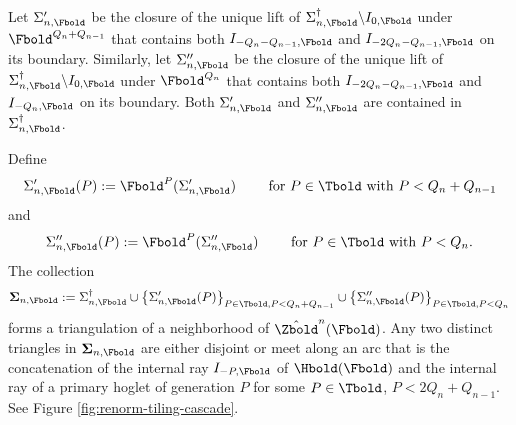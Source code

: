 \documentclass{amsart}
\begin{document}
    Let $\Sigma'_{n,\Fbold}$ be the closure of the unique lift of $\Sigma^\dagger_{n,\Fbold} \backslash I_{0,\Fbold}$ under $\Fbold^{Q_n+Q_{n-1}}$ that contains both $I_{-Q_n-Q_{n-1},\Fbold}$ and $I_{-2Q_n-Q_{n-1},\Fbold}$ on its boundary.
    Similarly, let $\Sigma''_{n,\Fbold}$ be the closure of the unique lift of $\Sigma^\dagger_{n,\Fbold} \backslash I_{0,\Fbold}$ under $\Fbold^{Q_n}$ that contains both $I_{-2Q_n-Q_{n-1},\Fbold}$ and $I_{-Q_n,\Fbold}$ on its boundary.
    Both $\Sigma'_{n,\Fbold}$ and $\Sigma''_{n,\Fbold}$ are contained in $\Sigma^\dagger_{n,\Fbold}$.
    
    Define
    \[
        \Sigma'_{n,\Fbold}(P) := \Fbold^P( \Sigma'_{n,\Fbold} ) \qquad
        \text{ for } P \in \Tbold \text{ with } P < Q_n + Q_{n-1}
    \]
    and
    \[
        \Sigma''_{n,\Fbold}(P) := \Fbold^P( \Sigma''_{n,\Fbold} ) \qquad
        \text{ for } P \in \Tbold \text{ with } P < Q_n.
    \]
    The collection
    \[
        \boldsymbol{\Sigma}_{n,\Fbold} := \Sigma^\dagger_{n,\Fbold} \cup  \left\{ \Sigma'_{n,\Fbold}(P) \right\}_{P \in \Tbold, P< Q_n+Q_{n-1}} 
        \cup
        \left\{ \Sigma''_{n,\Fbold}(P) \right\}_{P \in \Tbold, P<Q_n} 
    \]
    forms a triangulation of a neighborhood of $\hat{\Zbold}^n (\Fbold)$.
    Any two distinct triangles in $\boldsymbol{\Sigma}_{n,\Fbold}$ are either disjoint or meet along an arc that is the concatenation of the internal ray $I_{-P,\Fbold}$ of $\Hbold(\Fbold)$ and the internal ray of a primary hoglet of generation $P$ for some $P \in \Tbold$, $P < 2Q_n+Q_{n-1}$.
    See Figure \ref{fig:renorm-tiling-cascade}.
\end{document}

